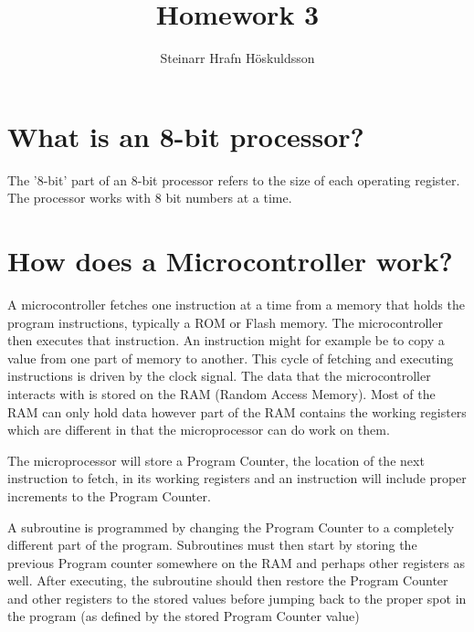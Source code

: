 \documentclass{article}
\title{Homework 3}
\author{Steinarr Hrafn Höskuldsson}
\newcommand{\mycomment}[1]{}
\begin{document}
\mycomment{

\begin{figure}[h]
    \centering
    \texttt{[image: LAB3/Basic1.png]}
    \caption{"Switch test" Breadboard set up}
    \label{fig:Switch_test}
\end{figure}



} %

\pagestyle{firststyle}
{\let\newpage\relax\maketitle}
\section*{What is an 8-bit processor?}
The '8-bit' part of an 8-bit processor refers to the size of each operating register. The processor works with 8 bit numbers at a time.

\section*{How does a Microcontroller work?}
A microcontroller fetches one instruction at a time from a memory that holds the program instructions, typically a ROM or Flash memory. The microcontroller then executes that instruction. An instruction might for example be to copy a value from one part of memory to another. This cycle of fetching and executing instructions is driven by the clock signal. The data that the microcontroller interacts with is stored on the RAM (Random Access Memory). Most of the RAM can only hold data however part of the RAM contains the working registers which are different in that the microprocessor can do work on them.

The microprocessor will store a Program Counter, the location of the next instruction to fetch, in its working registers and an instruction will include proper increments to the Program Counter.

A subroutine is programmed by changing the Program Counter to a completely different part of the program. Subroutines must then start by storing the previous Program counter somewhere on the RAM and perhaps other registers as well. After executing, the subroutine should then restore the Program Counter and other registers to the stored values before jumping back to the proper spot in the program (as defined by the stored Program Counter value)
\end{document}
